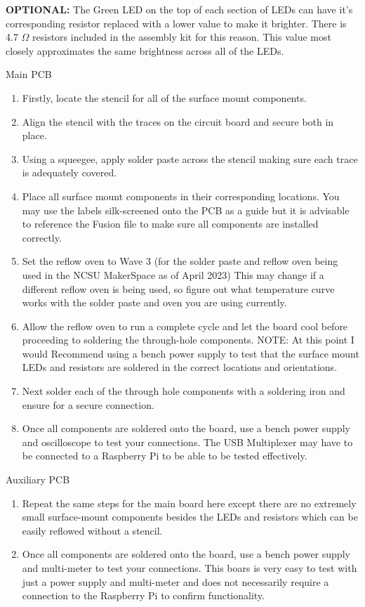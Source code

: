 \textbf{OPTIONAL: }The Green LED on the top of each section of LEDs can have it's corresponding resistor replaced with a lower value to make it brighter. There is 4.7 $\Omega$ resistors included in the assembly kit for this reason. This value most closely approximates the same brightness across all of the LEDs. 

\begin{subsubsec}{Main PCB}
\begin{enumerate}
    \item Firstly, locate the stencil for all of the surface mount components. 
    \item Align the stencil with the traces on the circuit board and secure both in place.
    \item Using a squeegee, apply solder paste across the stencil making sure each trace is adequately covered. 
    \item Place all surface mount components in their corresponding locations. You may use the labels silk-screened onto the PCB as a guide but it is advisable to reference the Fusion file to make sure all components are installed correctly.
    \item Set the reflow oven to Wave 3 (for the solder paste and reflow oven being used in the NCSU MakerSpace as of April 2023) This may change if a different reflow oven is being used, so figure out what temperature curve works with the solder paste and oven you are using currently.
    \item Allow the reflow oven to run a complete cycle and let the board cool before proceeding to soldering the through-hole components. 
    NOTE: At this point I would Recommend using a bench power supply to test that the surface mount LEDs and resistors are soldered in the correct locations and orientations. 
    \item Next solder each of the through hole components with a soldering iron and ensure for a secure connection. 
    \item Once all components are soldered onto the board, use a bench power supply and oscilloscope to test your connections. The USB Multiplexer may have to be connected to a Raspberry Pi to be able to be tested effectively.
\end{enumerate}
\end{subsubsec}


\begin{subsubsec}{Auxiliary PCB}
\begin{enumerate}
    \item Repeat the same steps for the main board here except there are no extremely small surface-mount components besides the LEDs and resistors which can be easily reflowed without a stencil. 
    \item Once all components are soldered onto the board, use a bench power supply and multi-meter to test your connections. This boars is very easy to test with just a power supply and multi-meter and does not necessarily require a connection to the Raspberry Pi to confirm functionality. 
\end{enumerate}
\end{subsubsec}
